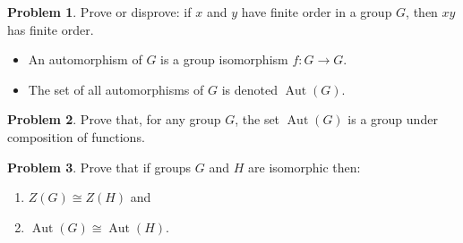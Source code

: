 \documentclass[11pt]{article}
\DeclareMathOperator{\Aut}{Aut}
\theoremstyle{definition}
\newtheorem{problem}{Problem}
\begin{document}
\begin{problem}
	Prove or disprove: if $x$ and $y$ have finite order in a group $G$, then $xy$ has finite order.
\end{problem}

\begin{itemize}
\item An automorphism of $G$ is a group isomorphism $f:G\to G$.
\item The set of all automorphisms of $G$ is denoted $\Aut(G)$.
\end{itemize}


\begin{problem}
Prove that,  for any group $G$, the set $\Aut(G)$  is a group under composition of functions.
\end{problem}



\begin{problem} Prove that if groups $G$ and $H$ are isomorphic then:
\begin{enumerate}
\item $Z(G)\cong Z(H)$ and
\item $\Aut(G)\cong \Aut(H)$.
\end{enumerate}
\end{problem}
\end{document}

